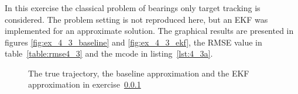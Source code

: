 \documentclass[a4paper,oneside,article]{memoir}
\begin{document}
\subsubsection{}\label{sec:4_3a}
In this exercise the classical problem of bearings only target tracking is considered.
The problem setting is not reproduced here, but an EKF was implemented for an approximate
solution. The graphical results are presented in figures \ref{fig:ex_4_3_baseline} and \ref{fig:ex_4_3_ekf}, the RMSE value
in table~\ref{table:rmse4_3} and the mcode in listing~\ref{lst:4_3a}.


\begin{figure}[htb]
  \begin{adjustwidth}{-2in}{-2in}
	  \centering
  \end{adjustwidth}
  	  \caption{The true trajectory, the baseline approximation and the EKF approximation in exercise~\ref{sec:4_3a}}
	  \label{fig:ex_4_3}
\end{figure}
\end{document}
